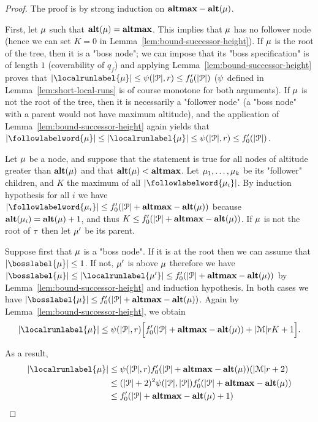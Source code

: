\begin{proof}
	The proof is by strong induction on $\mathbf{altmax}-\mathbf{alt}(\mu)$.

	First, let $\mu$ such that $\mathbf{alt}(\mu) = \mathbf{altmax}$. This implies that $\mu$ has no follower node (hence we can set $K=0$ in Lemma~\ref{lem:bound-successor-height}).  If $\mu$ is the root of the tree, then it is a "boss node"; we can impose that its "boss specification" is of length $1$ (coverability of $q_f$) and applying Lemma~\ref{lem:bound-successor-height} proves that $\size{\localrunlabel{\node}} \leq \towerfun(\size{\prot},r) \leq f_0'(\size{\prot})$ ($\psi$ defined in Lemma~\ref{lem:short-local-runs} is of course monotone for both arguments). If $\mu$ is not the root of the tree, then it is necessarily a "follower node" (a "boss node" with a parent would not have maximum altitude), and the application of Lemma~\ref{lem:bound-successor-height} again yields that $\size{\followlabelword{\node}} \leq \size{\localrunlabel{\node}} \leq \towerfun(\size{\prot},r) \leq f_0'(\size{\prot})$.   

	Let $\mu$ be a node, and suppose that the statement is true for all nodes of altitude greater than $\mathbf{alt}(\mu)$ and that $\mathbf{alt}(\mu) < \mathbf{altmax}$. 
	Let $\mu_1, \ldots, \mu_k$ be its "follower" children, and $K$ the maximum of all $\size{\followlabelword{\node_i}}$.  By induction hypothesis for all $i$ we have 
	$\size{\followlabelword{\node_i}} \leq f_0'(\size{\prot} + \altmax-\altitude{\node})$ because $\mathbf{alt}(\mu_i) = \mathbf{alt}(\mu)+1$, and thus $K \leq f_0'(|\mathcal{P}| + \mathbf{altmax}-\mathbf{alt}(\mu))$. If $\mu$ is not the root of $\tau$ then let $\mu'$ be its parent.
	
	Suppose first that $\mu$ is a "boss node". If it is at the root then we can assume that $\size{\bosslabel{\node}} \leq 1$.  If not, $\mu'$ is above $\mu$ therefore we have $\size{\bosslabel{\node}} \leq \size{\localrunlabel{\node'}} \leq f_0'(\size{\prot} + \altmax - \altitude{\node})$ by Lemma~\ref{lem:bound-successor-height} and induction hypothesis. In both cases we have $\size{\bosslabel{\node}} \leq f_0'(\size{\prot} +\altmax - \altitude{\node})$.	
	Again by Lemma~\ref{lem:bound-successor-height}, we obtain \[\size{\localrunlabel{\node}} \leq \towerfun(\size{\prot},r) \Big[f_0'(\size{\prot} + \altmax-\altitude{\node}) + \size{\messages}rK +1 \Big]. \]
	
	 As a result, 
	\begin{align*}
	\size{\localrunlabel{\node}}& 
	\leq \towerfun(\size{\prot},r) f_0'(\size{\prot} + \altmax-\altitude{\node})(\size{\messages} r +2) \\&  
	\leq (\size{\prot}+2)^2 \towerfun(\size{\prot},\size{\prot}) f_0'(\size{\prot} + \altmax - \altitude{\node}) \\& 
	\leq f_0'(\size{\prot} + \altmax - \altitude{\node}+1)
	\end{align*}
	

\end{proof}
